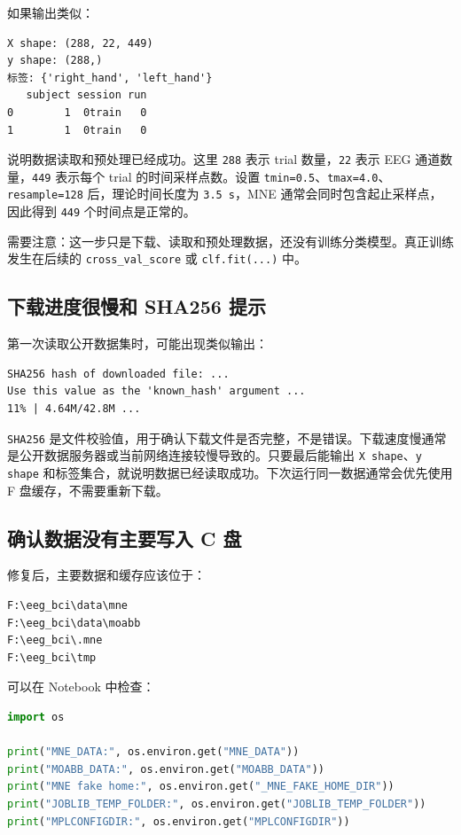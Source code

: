 \documentclass[UTF8,a4paper,12pt]{ctexart}
\begin{document}
如果输出类似：

\begin{lstlisting}[language={}]
X shape: (288, 22, 449)
y shape: (288,)
标签: {'right_hand', 'left_hand'}
   subject session run
0        1  0train   0
1        1  0train   0
\end{lstlisting}

说明数据读取和预处理已经成功。这里 \texttt{288} 表示 trial 数量，\texttt{22} 表示 EEG 通道数量，\texttt{449} 表示每个 trial 的时间采样点数。设置 \texttt{tmin=0.5}、\texttt{tmax=4.0}、\texttt{resample=128} 后，理论时间长度为 \texttt{3.5 s}，MNE 通常会同时包含起止采样点，因此得到 \texttt{449} 个时间点是正常的。

需要注意：这一步只是下载、读取和预处理数据，还没有训练分类模型。真正训练发生在后续的 \texttt{cross\_val\_score} 或 \texttt{clf.fit(...)} 中。

\subsection{下载进度很慢和 SHA256 提示}

第一次读取公开数据集时，可能出现类似输出：

\begin{lstlisting}[language={}]
SHA256 hash of downloaded file: ...
Use this value as the 'known_hash' argument ...
11% | 4.64M/42.8M ...
\end{lstlisting}

\texttt{SHA256} 是文件校验值，用于确认下载文件是否完整，不是错误。下载速度慢通常是公开数据服务器或当前网络连接较慢导致的。只要最后能输出 \texttt{X shape}、\texttt{y shape} 和标签集合，就说明数据已经读取成功。下次运行同一数据通常会优先使用 F 盘缓存，不需要重新下载。

\subsection{确认数据没有主要写入 C 盘}

修复后，主要数据和缓存应该位于：

\begin{lstlisting}[language={}]
F:\eeg_bci\data\mne
F:\eeg_bci\data\moabb
F:\eeg_bci\.mne
F:\eeg_bci\tmp
\end{lstlisting}

可以在 Notebook 中检查：

\begin{lstlisting}[language=Python,caption={检查数据和配置路径}]
import os

print("MNE_DATA:", os.environ.get("MNE_DATA"))
print("MOABB_DATA:", os.environ.get("MOABB_DATA"))
print("MNE fake home:", os.environ.get("_MNE_FAKE_HOME_DIR"))
print("JOBLIB_TEMP_FOLDER:", os.environ.get("JOBLIB_TEMP_FOLDER"))
print("MPLCONFIGDIR:", os.environ.get("MPLCONFIGDIR"))
\end{lstlisting}
\end{document}
